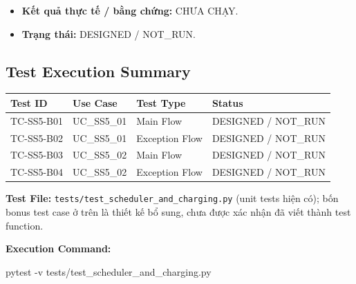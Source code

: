 \documentclass[11pt,a4paper]{article}
\providecommand{\tightlist}{%
  \setlength{\itemsep}{0pt}\setlength{\parskip}{0pt}}
\newenvironment{Shaded}{}{}
\newcommand{\AttributeTok}[1]{\textcolor[rgb]{0.49,0.56,0.16}{#1}}
\newcommand{\ExtensionTok}[1]{#1}
\newcommand{\NormalTok}[1]{#1}
\begin{document}
\begin{itemize}
  \begin{itemize}
  \tightlist
  \item
    Phiên sạc đạt trạng thái \texttt{GRACE\_PERIOD}.
  \item
    Khi xe rời cổng trong thời gian ân hạn, phiên sạc được kết thúc.
  \item
    Phiên sạc được loại khỏi \texttt{\_active\_sessions}.
  \item
    Không phát sinh phí Overstay.
  \item
    Cổng sạc có thể được sử dụng cho request tiếp theo.
  \end{itemize}
\item
  \textbf{Kết quả thực tế / bằng chứng:} CHƯA CHẠY.
\item
  \textbf{Trạng thái:} DESIGNED / NOT\_RUN.
\end{itemize}

\hypertarget{test-execution-summary}{%
\subsection{Test Execution Summary}\label{test-execution-summary}}

\begin{longtable}[]{@{}llll@{}}
\toprule\noalign{}
Test ID & Use Case & Test Type & Status \\
\midrule\noalign{}
\endhead
\bottomrule\noalign{}
\endlastfoot
TC-SS5-B01 & UC\_SS5\_01 & Main Flow & DESIGNED / NOT\_RUN \\
TC-SS5-B02 & UC\_SS5\_01 & Exception Flow & DESIGNED / NOT\_RUN \\
TC-SS5-B03 & UC\_SS5\_02 & Main Flow & DESIGNED / NOT\_RUN \\
TC-SS5-B04 & UC\_SS5\_02 & Exception Flow & DESIGNED / NOT\_RUN \\
\end{longtable}

\textbf{Test File:} \texttt{tests/test\_scheduler\_and\_charging.py}
(unit tests hiện có); bốn bonus test case ở trên là thiết kế bổ sung,
chưa được xác nhận đã viết thành test function.

\textbf{Execution Command:}

\begin{Shaded}
\begin{Highlighting}[]
\ExtensionTok{pytest} \AttributeTok{{-}v}\NormalTok{ tests/test\_scheduler\_and\_charging.py}
\end{Highlighting}
\end{Shaded}
\end{document}
